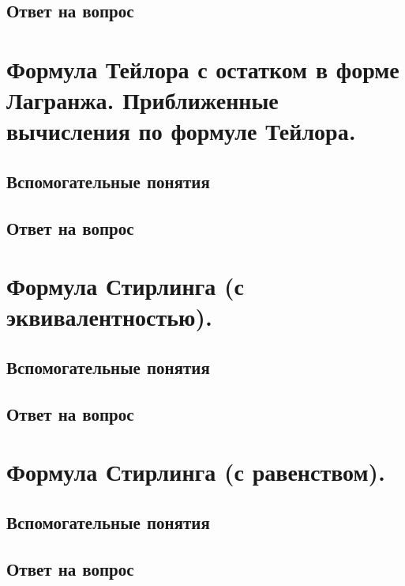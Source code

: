 \documentclass[12pt,a4paper]{article}
\begin{document}
\subsection*{Ответ на вопрос}


\newpage
\section{Формула Тейлора с остатком в форме Лагранжа. Приближенные вычисления по формуле Тейлора.}

\subsection*{Вспомогательные понятия}


\subsection*{Ответ на вопрос}


\newpage
\section{Формула Стирлинга (с эквивалентностью).}

\subsection*{Вспомогательные понятия}


\subsection*{Ответ на вопрос}


\newpage
\section{Формула Стирлинга (с равенством).}

\subsection*{Вспомогательные понятия}


\subsection*{Ответ на вопрос}

\end{document}

